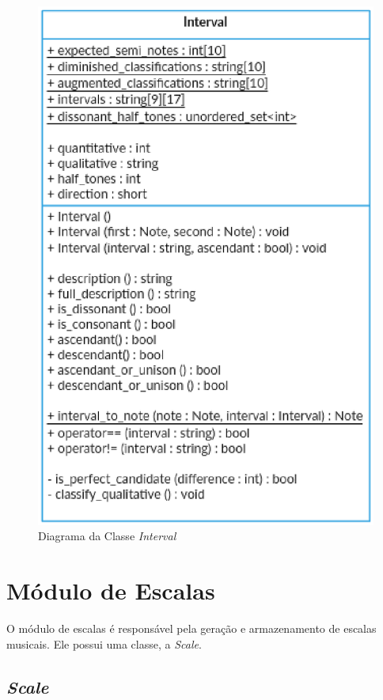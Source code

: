       \begin{figure}[htb]
        \centering
        \includegraphics[scale=0.7]{figuras/intervalclass.eps}
        \caption{Diagrama da Classe \textit{Interval}}
        \label{intervalclass}
      \end{figure}

  \section[Módulo de Escalas]{Módulo de Escalas}

    O módulo de escalas é responsável pela geração e armazenamento de escalas musicais. Ele possui uma classe, a \textit{Scale}.

    \subsection[\textit{Scale}]{\textit{Scale}}

